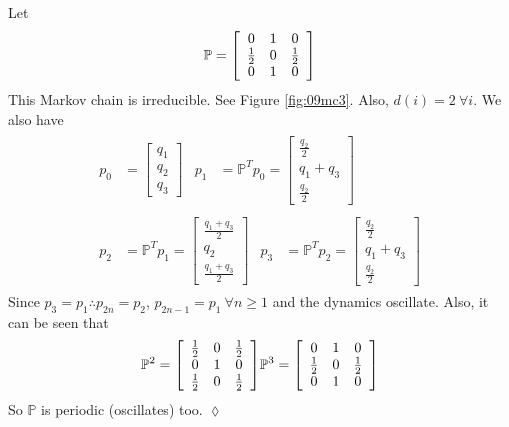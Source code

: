 \begin{example}
Let
$$\mathbb{P} = \left[\begin{array}{c c c} 0 & 1 & 0 \\ \frac{1}{2} & 0 & \frac{1}{2} \\ 0 & 1 & 0 \end{array}\right]$$
This Markov chain is irreducible. See Figure \ref{fig:09mc3}. Also, $d(i)=2 ~\forall i$. We also have
\begin{align*}
\begin{split}
p_0 &= \left[\begin{array}{c} q_1 \\ q_2 \\ q_3 \end{array}\right]
\end{split}
\begin{split}
p_1 &= \mathbb{P}^Tp_0 = \left[\begin{array}{c} \frac{q_2}{2} \\ q_1+q_3 \\ \frac{q_2}{2} \end{array}\right]
\end{split} \\
\begin{split}
p_2 &= \mathbb{P}^Tp_1 = \left[\begin{array}{c} \frac{q_1+q_3}{2} \\ q_2 \\ \frac{q_1+q_3}{2} \end{array}\right]
\end{split}
\begin{split}
p_3 &= \mathbb{P}^Tp_2 = \left[\begin{array}{c} \frac{q_2}{2} \\ q_1+q_3 \\ \frac{q_2}{2} \end{array}\right]
\end{split}
\end{align*}
Since $p_3=p_1 \therefore p_{2n}=p_2$, $p_{2n-1}=p_1 ~\forall n\geq1$ and the dynamics oscillate. Also, it can be seen that
\begin{align*}
\begin{split}
\mathbb{P}^2 = \left[\begin{array}{c c c} \frac{1}{2} & 0 & \frac{1}{2} \\ 0 & 1 & 0 \\ \frac{1}{2} & 0 & \frac{1}{2} \end{array}\right]
\end{split}
\begin{split}
\mathbb{P}^3 = \left[\begin{array}{c c c} 0 & 1 & 0 \\ \frac{1}{2} & 0 & \frac{1}{2} \\ 0 & 1 & 0 \end{array}\right]
\end{split}
\end{align*}
So $\mathbb{P}$ is periodic (oscillates) too.
$\lozenge$
\end{example}

